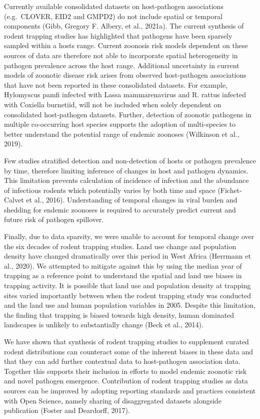 \documentclass[
]{article}
\begin{document}
Currently available consolidated datasets on host-pathogen associations
(e.g.~CLOVER, EID2 and GMPD2) do not include spatial or temporal
components (Gibb, Gregory F. Albery, et al., 2021a). The current
synthesis of rodent trapping studies has highlighted that pathogens have
been sparsely sampled within a hosts range. Current zoonosis risk models
dependent on these sources of data are therefore not able to incorporate
spatial heterogeneity in pathogen prevalence across the host range.
Additional uncertainty in current models of zoonotic disease risk arises
from observed host-pathogen associations that have not been reported in
these consolidated datasets. For example, Hylomyscus pamfi infected with
Lassa mammarenavirus and R. rattus infected with Coxiella burnetiid,
will not be included when solely dependent on consolidated host-pathogen
datasets. Further, detection of zoonotic pathogens in multiple
co-occurring host species supports the adoption of multi-species to
better understand the potential range of endemic zoonoses (Wilkinson et
al., 2019).

Few studies stratified detection and non-detection of hosts or pathogen
prevalence by time, therefore limiting inference of changes in host and
pathogen dynamics. This limitation prevents calculation of incidence of
infection and the abundance of infectious rodents which potentially
varies by both time and space (Fichet-Calvet et al., 2016).
Understanding of temporal changes in viral burden and shedding for
endemic zoonoses is required to accurately predict current and future
risk of pathogen spillover.

Finally, due to data sparsity, we were unable to account for temporal
change over the six decades of rodent trapping studies. Land use change
and population density have changed dramatically over this period in
West Africa (Herrmann et al., 2020). We attempted to mitigate against
this by using the median year of trapping as a reference point to
understand the spatial and land use biases in trapping activity. It is
possible that land use and population density at trapping sites varied
importantly between when the rodent trapping study was conducted and the
land use and human population variables in 2005. Despite this
limitation, the finding that trapping is biased towards high density,
human dominated landscapes is unlikely to substantially change (Beck et
al., 2014).

We have shown that synthesis of rodent trapping studies to supplement
curated rodent distributions can counteract some of the inherent biases
in these data and that they can add further contextual data to
host-pathogen association data. Together this supports their inclusion
in efforts to model endemic zoonotic risk and novel pathogen emergence.
Contribution of rodent trapping studies as data sources can be improved
by adopting reporting standards and practices consistent with Open
Science, namely sharing of disaggregated datasets alongside publication
(Foster and Deardorff, 2017).
\end{document}
